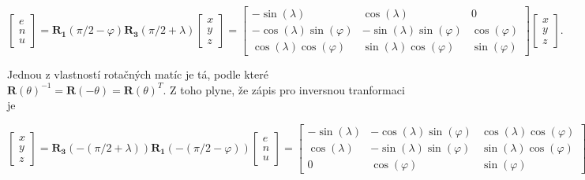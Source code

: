\documentclass[11pt,a4paper]{article}
\begin{document}
\begin{equation}
\begin{bmatrix}
e \\
n \\
u
\end{bmatrix} =
\mathbf{R_{1}}\left(\pi/2-\varphi\right)\mathbf{R_{3}}\left(\pi/2+\lambda\right)
\begin{bmatrix}
x \\
y \\
z
\end{bmatrix} =
\begin{bmatrix}
-\sin{\left(\lambda\right)} & \cos{\left(\lambda\right)} & 0 \\
-\cos{\left(\lambda\right)}\sin{\left(\varphi\right)} & -\sin{\left(\lambda\right)}\sin{\left(\varphi\right)} & \cos{\left(\varphi\right)} \\
\cos{\left(\lambda\right)}\cos{\left(\varphi\right)} & \sin{\left(\lambda\right)}\cos{\left(\varphi\right)} & \sin{\left(\varphi\right)}
\end{bmatrix}
\begin{bmatrix}
x \\
y \\
z
\end{bmatrix}.
\label{rov:ecef2enu2}
\end{equation}

Jednou z vlastností rotačných matíc je tá, podle které $\mathbf{R}\left(\theta\right)^{-1} = \mathbf{R}\left(-\theta\right) = \mathbf{R}\left(\theta\right)^{T}$. Z toho plyne, že zápis pro inversnou tranformaci je

\begin{equation}
\begin{bmatrix}
x \\
y \\
z
\end{bmatrix} =
\mathbf{R_{3}}\left(-\left(\pi/2+\lambda\right)\right)\mathbf{R_{1}}\left(-\left(\pi/2-\varphi\right)\right)
\begin{bmatrix}
e \\
n \\
u
\end{bmatrix} = 
\begin{bmatrix}
-\sin{\left(\lambda\right)} & -\cos{\left(\lambda\right)}\sin{\left(\varphi\right)} & \cos{\left(\lambda\right)}\cos{\left(\varphi\right)} \\
 \cos{\left(\lambda\right)} & -\sin{\left(\lambda\right)}\sin{\left(\varphi\right)} & \sin{\left(\lambda\right)}\cos{\left(\varphi\right)} \\
 0  &  \cos{\left(\varphi\right)} & \sin{\left(\varphi\right)} 
\end{bmatrix}
\begin{bmatrix}
e \\
n \\
u
\end{bmatrix}.
\label{rov:ecef2enu3}
\end{equation}
\end{document}
